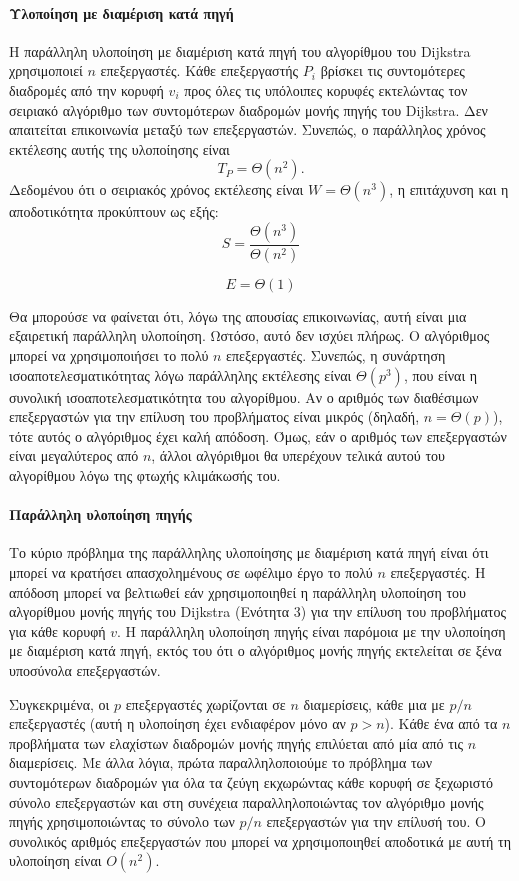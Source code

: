 \documentclass[12pt,a4paper]{article}
\begin{document}
\paragraph{Υλοποίηση με διαμέριση κατά πηγή}
Η παράλληλη υλοποίηση με διαμέριση κατά πηγή του αλγορίθμου του \foreignlanguage{english}{Dijkstra} χρησιμοποιεί $n$ επεξεργαστές. Κάθε επεξεργαστής $P_i$ βρίσκει τις συντομότερες διαδρομές από την κορυφή $v_i$ προς όλες τις υπόλοιπες κορυφές εκτελώντας τον σειριακό αλγόριθμο των συντομότερων διαδρομών μονής πηγής του \foreignlanguage{english}{Dijkstra}. Δεν απαιτείται επικοινωνία μεταξύ των επεξεργαστών. Συνεπώς, ο παράλληλος χρόνος εκτέλεσης αυτής της υλοποίησης είναι
\[
T_P = \Theta(n^{2}).
\]
Δεδομένου ότι ο σειριακός χρόνος εκτέλεσης είναι $W = \Theta(n^{3})$, η επιτάχυνση και η αποδοτικότητα προκύπτουν ως εξής:
\[
S = \frac{\Theta(n^{3})}{\Theta(n^{2})}
\]

\begin{equation}
E = \Theta(1)
\label{eq:relation5}
\end{equation}

Θα μπορούσε να φαίνεται ότι, λόγω της απουσίας επικοινωνίας, αυτή είναι μια εξαιρετική παράλληλη υλοποίηση. Ωστόσο, αυτό δεν ισχύει πλήρως. Ο αλγόριθμος μπορεί να χρησιμοποιήσει το πολύ $n$ επεξεργαστές. Συνεπώς, η συνάρτηση ισοαποτελεσματικότητας λόγω παράλληλης εκτέλεσης είναι $\Theta(p^3)$, που είναι η συνολική ισοαποτελεσματικότητα του αλγορίθμου. Αν ο αριθμός των διαθέσιμων επεξεργαστών για την επίλυση του προβλήματος είναι μικρός (δηλαδή, $n = \Theta(p)$), τότε αυτός ο αλγόριθμος έχει καλή απόδοση. Όμως, εάν ο αριθμός των επεξεργαστών είναι μεγαλύτερος από $n$, άλλοι αλγόριθμοι θα υπερέχουν τελικά αυτού του αλγορίθμου λόγω της φτωχής κλιμάκωσής του.

\paragraph{Παράλληλη υλοποίηση πηγής}
Το κύριο πρόβλημα της παράλληλης υλοποίησης με διαμέριση κατά πηγή είναι ότι μπορεί να κρατήσει απασχολημένους σε ωφέλιμο έργο το πολύ $n$ επεξεργαστές. Η απόδοση μπορεί να βελτιωθεί εάν χρησιμοποιηθεί η παράλληλη υλοποίηση του αλγορίθμου μονής πηγής του \foreignlanguage{english}{Dijkstra} (Ενότητα 3) για την επίλυση του προβλήματος για κάθε κορυφή $v$. Η παράλληλη υλοποίηση πηγής είναι παρόμοια με την υλοποίηση με διαμέριση κατά πηγή, εκτός του ότι ο αλγόριθμος μονής πηγής εκτελείται σε ξένα υποσύνολα επεξεργαστών.

Συγκεκριμένα, οι $p$ επεξεργαστές χωρίζονται σε $n$ διαμερίσεις, κάθε μια με $p/n$ επεξεργαστές (αυτή η υλοποίηση έχει ενδιαφέρον μόνο αν $p>n$). Κάθε ένα από τα $n$ προβλήματα των ελαχίστων διαδρομών μονής πηγής επιλύεται από μία από τις $n$ διαμερίσεις. Με άλλα λόγια, πρώτα παραλληλοποιούμε το πρόβλημα των συντομότερων διαδρομών για όλα τα ζεύγη εκχωρώντας κάθε κορυφή σε ξεχωριστό σύνολο επεξεργαστών και στη συνέχεια παραλληλοποιώντας τον αλγόριθμο μονής πηγής χρησιμοποιώντας το σύνολο των $p/n$ επεξεργαστών για την επίλυσή του. Ο συνολικός αριθμός επεξεργαστών που μπορεί να χρησιμοποιηθεί αποδοτικά με αυτή τη υλοποίηση είναι $O(n^{2})$.
\end{document}
